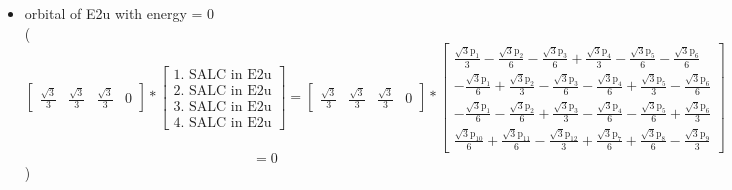 \documentclass[12pt,a4paper]{article}
\begin{document}
\begin{itemize}
\item orbital of E2u with energy = 
                                $0$ \\
( 
$$
\left[\begin{matrix}\frac{\sqrt{3}}{3} & \frac{\sqrt{3}}{3} & \frac{\sqrt{3}}{3} & 0\end{matrix}\right] * \left[\begin{array}{c}\text{1. SALC in E2u} \\ \text{2. SALC in E2u} \\ \text{3. SALC in E2u} \\ \text{4. SALC in E2u}\end{array}\right] = \left[\begin{matrix}\frac{\sqrt{3}}{3} & \frac{\sqrt{3}}{3} & \frac{\sqrt{3}}{3} & 0\end{matrix}\right] * \left[\begin{matrix}\frac{\sqrt{3} \text{p}_{1}}{3} - \frac{\sqrt{3} \text{p}_{2}}{6} - \frac{\sqrt{3} \text{p}_{3}}{6} + \frac{\sqrt{3} \text{p}_{4}}{3} - \frac{\sqrt{3} \text{p}_{5}}{6} - \frac{\sqrt{3} \text{p}_{6}}{6}\\- \frac{\sqrt{3} \text{p}_{1}}{6} + \frac{\sqrt{3} \text{p}_{2}}{3} - \frac{\sqrt{3} \text{p}_{3}}{6} - \frac{\sqrt{3} \text{p}_{4}}{6} + \frac{\sqrt{3} \text{p}_{5}}{3} - \frac{\sqrt{3} \text{p}_{6}}{6}\\- \frac{\sqrt{3} \text{p}_{1}}{6} - \frac{\sqrt{3} \text{p}_{2}}{6} + \frac{\sqrt{3} \text{p}_{3}}{3} - \frac{\sqrt{3} \text{p}_{4}}{6} - \frac{\sqrt{3} \text{p}_{5}}{6} + \frac{\sqrt{3} \text{p}_{6}}{3}\\\frac{\sqrt{3} \text{p}_{10}}{6} + \frac{\sqrt{3} \text{p}_{11}}{6} - \frac{\sqrt{3} \text{p}_{12}}{3} + \frac{\sqrt{3} \text{p}_{7}}{6} + \frac{\sqrt{3} \text{p}_{8}}{6} - \frac{\sqrt{3} \text{p}_{9}}{3}\end{matrix}\right] 
 $$ $$ = 0 
 $$ 
 )


\end{itemize}
\end{document}

